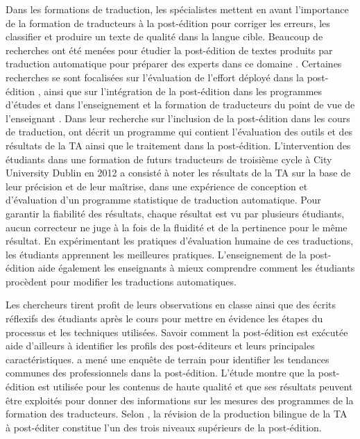\documentclass[french]{textolivre}
\begin{document}
Dans les formations de traduction, les spécialistes mettent en avant l’importance de la formation de traducteurs à la post-édition pour corriger les erreurs, les classifier et produire un texte de qualité dans la langue cible. Beaucoup de recherches ont été menées pour étudier la post-édition de textes produits par traduction automatique pour préparer des experts dans ce domaine \cite{blagodarna_insights_2018}. Certaines recherches se sont focalisées sur l’évaluation de l’effort déployé dans la post-édition \cite{gaspari_perception_2014, koponen_comparing_2012}, ainsi que sur l’intégration de la post-édition dans les programmes d’études et dans l’enseignement et la formation de traducteurs du point de vue de l’enseignant \cite{ginovart_language_2020, guerberof_arenas_machine_2019, flanagan_testing_2014}. Dans leur recherche sur l’inclusion de la post-édition dans les cours de traduction, \textcite{doherty_design_2014} ont décrit un programme qui contient l’évaluation des outils et des résultats de la TA ainsi que le traitement dans la post-édition. L’intervention des étudiants dans une formation de futurs traducteurs de troisième cycle à City University Dublin en 2012 a consisté à noter les résultats de la TA sur la base de leur précision et de leur maîtrise, dans une expérience de conception et d’évaluation d’un programme statistique de traduction automatique. Pour garantir la fiabilité des résultats, chaque résultat est vu par plusieurs étudiants, aucun correcteur ne juge à la fois de la fluidité et de la pertinence pour le même résultat. En expérimentant les pratiques d’évaluation humaine de ces traductions, les étudiants apprennent les meilleures pratiques. L’enseignement de la post-édition aide également les enseignants à mieux comprendre comment les étudiants procèdent pour modifier les traductions automatiques.

Les chercheurs tirent profit de leurs observations en classe ainsi que des écrits réflexifs des étudiants après le cours \cite{koponen_how_2015} pour mettre en évidence les étapes du processus et les techniques utilisées. Savoir comment la post-édition est exécutée aide d’ailleurs à identifier les profils des post-éditeurs et leurs principales caractéristiques. \textcite{blagodarna_insights_2018} a mené une enquête de terrain pour identifier les tendances communes des professionnels dans la post-édition. L’étude montre que la post-édition est utilisée pour les contenus de haute qualité et que ses résultats peuvent être exploités pour donner des informations sur les mesures des programmes de la formation des traducteurs. Selon \textcite{ginovart_language_2020}, la révision de la production bilingue de la TA à post-éditer constitue l’un des trois niveaux supérieurs de la post-édition.
\end{document}
